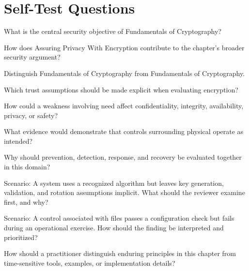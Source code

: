 \documentclass[11pt,letterpaper]{article}
\begin{document}
\section*{Self-Test Questions}
\begin{CornellRecallList}
\item What is the central security objective of Fundamentals of Cryptography?
\item How does Assuring Privacy With Encryption contribute to the chapter's broader security argument?
\item Distinguish Fundamentals of Cryptography from Fundamentals of Cryptography.
\item Which trust assumptions should be made explicit when evaluating encryption?
\item How could a weakness involving need affect confidentiality, integrity, availability, privacy, or safety?
\item What evidence would demonstrate that controls surrounding physical operate as intended?
\item Why should prevention, detection, response, and recovery be evaluated together in this domain?
\item Scenario: A system uses a recognized algorithm but leaves key generation, validation, and rotation assumptions implicit. What should the reviewer examine first, and why?
\item Scenario: A control associated with files passes a configuration check but fails during an operational exercise. How should the finding be interpreted and prioritized?
\item How should a practitioner distinguish enduring principles in this chapter from time-sensitive tools, examples, or implementation details?
\end{CornellRecallList}
\end{document}
